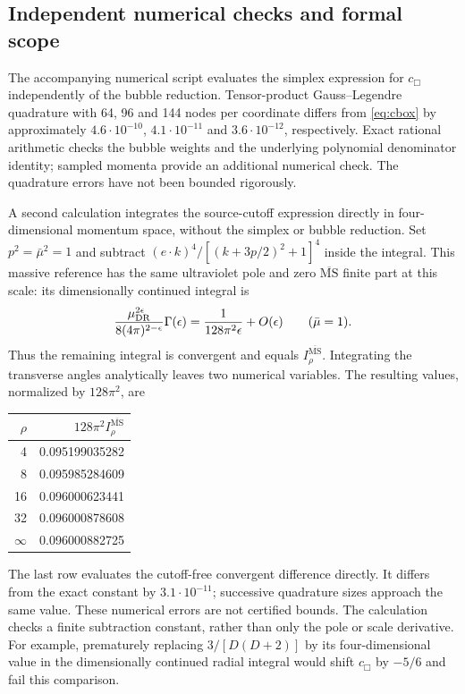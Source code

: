 \documentclass[11pt]{article}
\newcommand{\MS}{\overline{\mathrm{MS}}}
\begin{document}
\subsection{Independent numerical checks and formal scope}

The accompanying numerical script evaluates the simplex expression for
$c_\Box$ independently of the bubble reduction. Tensor-product Gauss--Legendre
quadrature with 64, 96 and 144 nodes per coordinate differs from
\eqref{eq:cbox} by approximately $4.6\cdot10^{-10}$,
$4.1\cdot10^{-11}$ and $3.6\cdot10^{-12}$, respectively. Exact rational
arithmetic checks the bubble weights and the underlying polynomial
denominator identity; sampled momenta provide an additional numerical
check. The quadrature errors have not been bounded rigorously.

A second calculation integrates the source-cutoff expression directly in
four-dimensional momentum space, without the simplex or bubble reduction.
Set $p^2=\bar\mu^2=1$ and subtract
$(e\cdot k)^4/[(k+3p/2)^2+1]^4$ inside the integral. This massive reference
has the same ultraviolet pole and zero $\MS$ finite part at this scale:
its dimensionally continued integral is
\[
 \frac{\mu_{\rm DR}^{2\epsilon}}{8(4\pi)^{2-\epsilon}}
 \Gamma(\epsilon)
 =\frac1{128\pi^2\epsilon}+O(\epsilon)
 \qquad (\bar\mu=1).
\]
Thus the remaining integral is convergent and equals $I_\rho^{\MS}$.
Integrating the transverse angles analytically leaves two numerical
variables. The resulting values, normalized by $128\pi^2$, are
\begin{center}
\begin{tabular}{@{}rr@{}}
\toprule $\rho$ & $128\pi^2 I_\rho^{\MS}$\\\midrule
4 & 0.095199035282\\
8 & 0.095985284609\\
16 & 0.096000623441\\
32 & 0.096000878608\\
$\infty$ & 0.096000882725\\
\bottomrule
\end{tabular}
\end{center}
The last row evaluates the cutoff-free convergent difference directly. It
differs from the exact constant by $3.1\cdot10^{-11}$; successive quadrature
sizes approach the same value. These numerical errors are not certified
bounds. The calculation checks a finite subtraction constant, rather than
only the pole or scale derivative. For example, prematurely replacing
$3/[D(D+2)]$ by its four-dimensional value in the dimensionally continued
radial integral would shift $c_\Box$ by $-5/6$ and fail this comparison.
\end{document}
